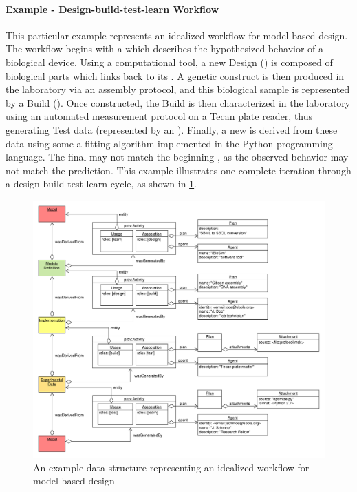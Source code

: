 \paragraph{Example - Design-build-test-learn Workflow}

This particular example represents an idealized workflow for model-based design. The workflow begins with a  which describes the hypothesized behavior of a biological device. Using a computational tool, a new Design () is composed of biological parts which links back to its . A genetic construct is then produced in the laboratory via an assembly protocol, and this biological sample is represented by a Build (). Once constructed, the Build is then characterized in the laboratory using an automated measurement protocol on a Tecan plate reader, thus generating Test data (represented by an ). Finally, a new  is derived from these data using some a fitting algorithm implemented in the Python programming language. The final  may not match the beginning , as the observed behavior may not match the prediction. This example illustrates one complete iteration through a design-build-test-learn cycle, as shown in \ref{images:design-build-test-learn}.

\begin{figure}[ht]
\begin{center}
\includegraphics[width=\linewidth]{uml/design-build-test}
\caption[]{An example data structure representing an idealized workflow for model-based
design}
\label{images:design-build-test-learn}
\end{center}
\end{figure}

